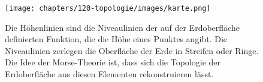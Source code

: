 %
%
%
\begin{figure}
\centering
\texttt{[image: chapters/120-topologie/images/karte.png]}
\caption{Die Höhenlinien sind die Niveaulinien der auf der Erdoberfläche
%
%
definierten Funktion, die die Höhe eines Punktes angibt.
Die Niveaulinien zerlegen die Oberfläche der Erde in Streifen oder Ringe.
Die Idee der Morse-Theorie ist, dass sich die Topologie der Erdoberfläche
aus diesen Elementen rekonstruieren lässt.
\label{buch:topologie:morse:fig:karte}}
\end{figure}
